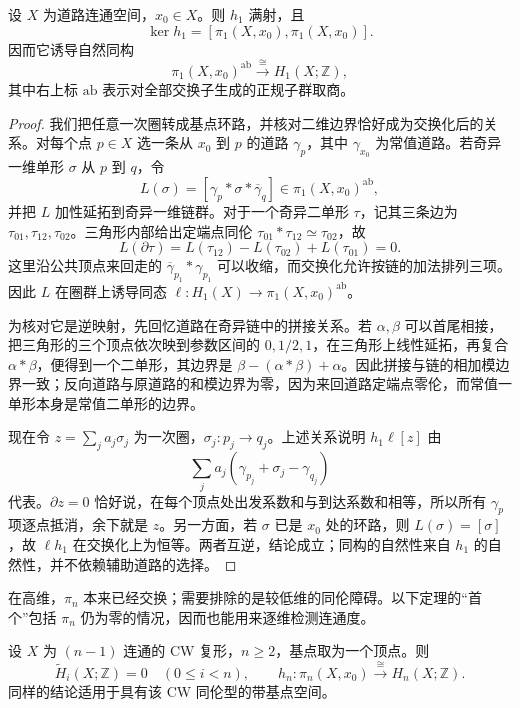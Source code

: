 \begin{theorem}[一维 Hurewicz 定理]\label{g2:thm:hurewicz-one}
	设 \(X\) 为道路连通空间，\(x_0\in X\)。则 \(h_1\) 满射，且
	\[
		\ker h_1=[\pi_1(X,x_0),\pi_1(X,x_0)].
	\]
	因而它诱导自然同构
	\[
		\pi_1(X,x_0)^{\mathrm{ab}}\xrightarrow{\ \cong\ }H_1(X;\mathbb Z),
	\]
	其中右上标 \(\mathrm{ab}\) 表示对全部交换子生成的正规子群取商。
\end{theorem}
\begin{proof}
	我们把任意一次圈转成基点环路，并核对二维边界恰好成为交换化后的关系。对每个点 \(p\in X\) 选一条从 \(x_0\) 到 \(p\) 的道路 \(\gamma_p\)，其中 \(\gamma_{x_0}\) 为常值道路。若奇异一维单形 \(\sigma\) 从 \(p\) 到 \(q\)，令
	\[
		L(\sigma)=[\gamma_p*\sigma*\overline\gamma_q]\in\pi_1(X,x_0)^{\mathrm{ab}},
	\]
	并把 \(L\) 加性延拓到奇异一维链群。对于一个奇异二单形 \(\tau\)，记其三条边为 \(\tau_{01},\tau_{12},\tau_{02}\)。三角形内部给出定端点同伦 \(\tau_{01}*\tau_{12}\simeq\tau_{02}\)，故
	\[
		L(\partial\tau)=L(\tau_{12})-L(\tau_{02})+L(\tau_{01})=0.
	\]
	这里沿公共顶点来回走的 \(\overline\gamma_{p_1}*\gamma_{p_1}\) 可以收缩，而交换化允许按链的加法排列三项。因此 \(L\) 在圈群上诱导同态 \(\ell:H_1(X)\to\pi_1(X,x_0)^{\mathrm{ab}}\)。

	为核对它是逆映射，先回忆道路在奇异链中的拼接关系。若 \(\alpha,\beta\) 可以首尾相接，把三角形的三个顶点依次映到参数区间的 \(0,1/2,1\)，在三角形上线性延拓，再复合 \(\alpha*\beta\)，便得到一个二单形，其边界是 \(\beta-(\alpha*\beta)+\alpha\)。因此拼接与链的相加模边界一致；反向道路与原道路的和模边界为零，因为来回道路定端点零伦，而常值一单形本身是常值二单形的边界。

	现在令 \(z=\sum_j a_j\sigma_j\) 为一次圈，\(\sigma_j:p_j\to q_j\)。上述关系说明 \(h_1\ell[z]\) 由
	\[
		\sum_j a_j(\gamma_{p_j}+\sigma_j-\gamma_{q_j})
	\]
	代表。\(\partial z=0\) 恰好说，在每个顶点处出发系数和与到达系数和相等，所以所有 \(\gamma_p\) 项逐点抵消，余下就是 \(z\)。另一方面，若 \(\sigma\) 已是 \(x_0\) 处的环路，则 \(L(\sigma)=[\sigma]\)，故 \(\ell h_1\) 在交换化上为恒等。两者互逆，结论成立；同构的自然性来自 \(h_1\) 的自然性，并不依赖辅助道路的选择。
\end{proof}

在高维，\(\pi_n\) 本来已经交换；需要排除的是较低维的同伦障碍。以下定理的“首个”包括 \(\pi_n\) 仍为零的情况，因而也能用来逐维检测连通度。

\begin{theorem}[Hurewicz 定理]\label{g2:thm:hurewicz-absolute}
	设 \(X\) 为 \((n-1)\) 连通的 CW 复形，\(n\ge2\)，基点取为一个顶点。则
	\[
		\widetilde H_i(X;\mathbb Z)=0\quad(0\le i<n),\qquad
		h_n:\pi_n(X,x_0)\xrightarrow{\ \cong\ }H_n(X;\mathbb Z).
	\]
	同样的结论适用于具有该 CW 同伦型的带基点空间。
\end{theorem}

